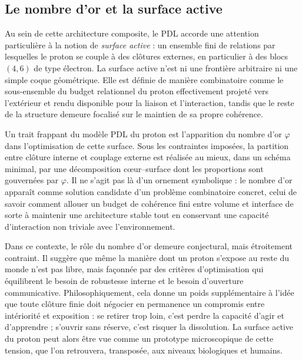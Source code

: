 \documentclass[11pt,a4paper]{article}
\theoremstyle{definition}
\begin{document}
\subsection{Le nombre d'or et la surface active}

Au sein de cette architecture composite, le PDL accorde une attention particulière à la notion de \emph{surface active} : un ensemble fini de relations par lesquelles le proton se couple à des clôtures externes, en particulier à des blocs \((4,6)\) de type électron.\cite{Laubscher_GoldenRatio_Sketch_2024,Laubscher_Born_Golden_v2_2024} La surface active n’est ni une frontière arbitraire ni une simple coque géométrique. Elle est définie de manière combinatoire comme le sous-ensemble du budget relationnel du proton effectivement projeté vers l’extérieur et rendu disponible pour la liaison et l’interaction, tandis que le reste de la structure demeure focalisé sur le maintien de sa propre cohérence.

Un trait frappant du modèle PDL du proton est l’apparition du nombre d’or \(\varphi\) dans l’optimisation de cette surface. Sous les contraintes imposées, la partition entre clôture interne et couplage externe est réalisée au mieux, dans un schéma minimal, par une décomposition cœur–surface dont les proportions sont gouvernées par \(\varphi\).\cite{Laubscher_GoldenRatio_Sketch_2024,Laubscher_Alpha_v2_2024} Il ne s’agit pas là d’un ornement symbolique : le nombre d’or apparaît comme solution candidate d’un problème combinatoire concret, celui de savoir comment allouer un budget de cohérence fini entre volume et interface de sorte à maintenir une architecture stable tout en conservant une capacité d’interaction non triviale avec l’environnement.

Dans ce contexte, le rôle du nombre d’or demeure conjectural, mais étroitement contraint. Il suggère que même la manière dont un proton s’expose au reste du monde n’est pas libre, mais façonnée par des critères d’optimisation qui équilibrent le besoin de robustesse interne et le besoin d’ouverture communicative.\cite{Laubscher_GoldenRatio_Sketch_2024,Laubscher_Born_Golden_v2_2024} Philosophiquement, cela donne un poids supplémentaire à l’idée que toute clôture finie doit négocier en permanence un compromis entre intériorité et exposition : se retirer trop loin, c’est perdre la capacité d’agir et d’apprendre ; s’ouvrir sans réserve, c’est risquer la dissolution. La surface active du proton peut alors être vue comme un prototype microscopique de cette tension, que l’on retrouvera, transposée, aux niveaux biologiques et humains.
\end{document}
